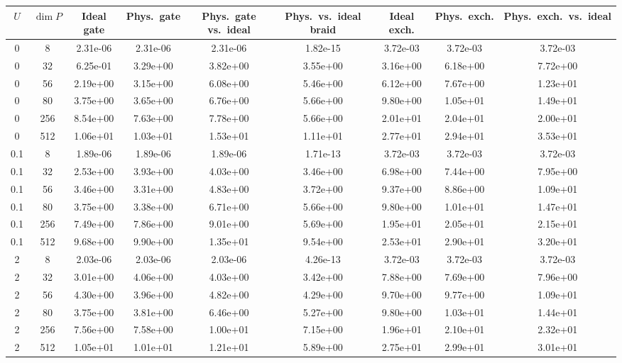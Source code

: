 \begin{tabular}{ccccccccc}
\hline
$U$ & $\dim P$ & Ideal gate & Phys.\ gate & Phys.\ gate vs.\ ideal & Phys.\ vs.\ ideal braid & Ideal exch. & Phys.\ exch. & Phys.\ exch.\ vs.\ ideal \\
\hline
0 & 8 & 2.31e-06 & 2.31e-06 & 2.31e-06 & 1.82e-15 & 3.72e-03 & 3.72e-03 & 3.72e-03 \\
0 & 32 & 6.25e-01 & 3.29e+00 & 3.82e+00 & 3.55e+00 & 3.16e+00 & 6.18e+00 & 7.72e+00 \\
0 & 56 & 2.19e+00 & 3.15e+00 & 6.08e+00 & 5.46e+00 & 6.12e+00 & 7.67e+00 & 1.23e+01 \\
0 & 80 & 3.75e+00 & 3.65e+00 & 6.76e+00 & 5.66e+00 & 9.80e+00 & 1.05e+01 & 1.49e+01 \\
0 & 256 & 8.54e+00 & 7.63e+00 & 7.78e+00 & 5.66e+00 & 2.01e+01 & 2.04e+01 & 2.00e+01 \\
0 & 512 & 1.06e+01 & 1.03e+01 & 1.53e+01 & 1.11e+01 & 2.77e+01 & 2.94e+01 & 3.53e+01 \\
\hline
0.1 & 8 & 1.89e-06 & 1.89e-06 & 1.89e-06 & 1.71e-13 & 3.72e-03 & 3.72e-03 & 3.72e-03 \\
0.1 & 32 & 2.53e+00 & 3.93e+00 & 4.03e+00 & 3.46e+00 & 6.98e+00 & 7.44e+00 & 7.95e+00 \\
0.1 & 56 & 3.46e+00 & 3.31e+00 & 4.83e+00 & 3.72e+00 & 9.37e+00 & 8.86e+00 & 1.09e+01 \\
0.1 & 80 & 3.75e+00 & 3.38e+00 & 6.71e+00 & 5.66e+00 & 9.80e+00 & 1.01e+01 & 1.47e+01 \\
0.1 & 256 & 7.49e+00 & 7.86e+00 & 9.01e+00 & 5.69e+00 & 1.95e+01 & 2.05e+01 & 2.15e+01 \\
0.1 & 512 & 9.68e+00 & 9.90e+00 & 1.35e+01 & 9.54e+00 & 2.53e+01 & 2.90e+01 & 3.20e+01 \\
\hline
2 & 8 & 2.03e-06 & 2.03e-06 & 2.03e-06 & 4.26e-13 & 3.72e-03 & 3.72e-03 & 3.72e-03 \\
2 & 32 & 3.01e+00 & 4.06e+00 & 4.03e+00 & 3.42e+00 & 7.88e+00 & 7.69e+00 & 7.96e+00 \\
2 & 56 & 4.30e+00 & 3.96e+00 & 4.82e+00 & 4.29e+00 & 9.70e+00 & 9.77e+00 & 1.09e+01 \\
2 & 80 & 3.75e+00 & 3.81e+00 & 6.46e+00 & 5.27e+00 & 9.80e+00 & 1.03e+01 & 1.44e+01 \\
2 & 256 & 7.56e+00 & 7.58e+00 & 1.00e+01 & 7.15e+00 & 1.96e+01 & 2.10e+01 & 2.32e+01 \\
2 & 512 & 1.05e+01 & 1.01e+01 & 1.21e+01 & 5.89e+00 & 2.75e+01 & 2.99e+01 & 3.01e+01 \\
\hline
\end{tabular}
